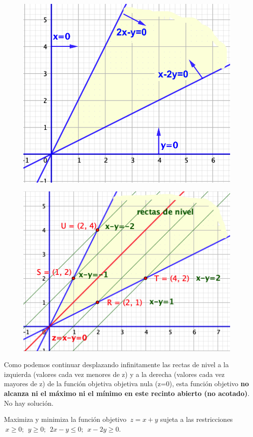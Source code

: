 \vspace{5mm}
\begin{multicols}{2}
\begin{figure}[H]
	\centering
	\includegraphics[width=.45\textwidth]{imagenes/img17.png}
\end{figure}
\begin{figure}[H]
	\centering
	\includegraphics[width=.5\textwidth]{imagenes/img18.png}
\end{figure}	
\end{multicols}
\vspace{5mm}

\begin{destacado}
Como podemos continuar desplazando infinitamente las rectas de nivel a la izquierda (valores cada vez menores de z) y a la derecha (valores cada vez mayores de z) de la función objetiva objetiva nula	 (z=0), esta función objetivo \textbf{no alcanza ni el máximo ni el mínimo en este recinto abierto (no acotado)}. No hay solución.
\end{destacado}

	
\vspace{5mm}	
\begin{ejemplo}
\begin{ejre}
Maximiza y minimiza la función objetivo $\ z=x+y$ sujeta a las restricciones 	$\ x\ge 0;\ \ y\ge 0;\ \ 2x-y\le 0;\ \ x-2y\ge 0$.
\end{ejre}
\end{ejemplo}

